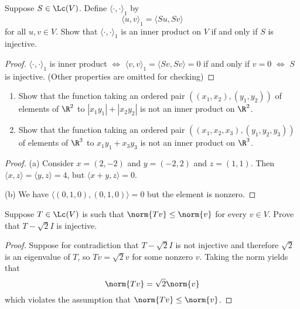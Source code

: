 \documentclass{extarticle}
\begin{document}
\begin{problem}{2}
    Suppose \(S \in \Lc(V)\). Define \(\langle \cdot, \cdot \rangle_1\) by
    \[\langle u,v \rangle_1 = \langle Su,Sv \rangle\]
    for all \(u, v \in V\). Show that \(\langle \cdot,\cdot \rangle_1\) is an inner product on
    \(V\) if and only if \(S\) is injective.
\end{problem}

\begin{proof}
    \(\langle \cdot,\cdot \rangle_1\) is inner product \(\Longleftrightarrow\)
    \(\langle v,v \rangle_1 = \langle Sv,Sv \rangle = 0\) if and only if \(v = 0\) \(\Longleftrightarrow\)
    \(S\) is injective. (Other properties are omitted for checking)
\end{proof}

\begin{problem}{3}
    \begin{enumerate}[label=(\alph*)]
        \item Show that the function taking an ordered pair \(((x_1, x_2), (y_1, y_2))\) of elements of
        \(\R^2\) to \(|x_1 y_1| + |x_2 y_2|\) is not an inner product on \(\R^2\).
        \item Show that the function taking an ordered pair \(((x_1, x_2, x_3), (y_1, y_2, y_3))\) of
        elements of \(\R^3\) to \(x_1y_1 + x_3y_3\) is not an inner product on \(\R^3\).
    \end{enumerate}
\end{problem}

\begin{proof}
(a) Consider \(x = (2, -2)\) and \(y = (-2, 2)\) and \(z = (1, 1)\). Then \(\langle x,z \rangle
= \langle y,z \rangle = 4\), but \(\langle x + y,z \rangle = 0\).

(b) We have \(\langle (0, 1, 0),(0, 1, 0) \rangle = 0\) but the element is nonzero.
\end{proof}

\begin{problem}{4}
    Suppose \(T \in \Lc(V)\) is such that \(\norm{Tv} \leq \norm{v}\) for every \(v \in V\). Prove that
    \(T - \sqrt{2}I\) is injective.
\end{problem}

\begin{proof}
Suppose for contradiction that \( T - \sqrt{2} I \) is not injective and therefore \(\sqrt{2}\) is an eigenvalue
of \(T\), so \(Tv = \sqrt{2}v\) for some nonzero \(v\). Taking the norm yields that
\[\norm{Tv} = \sqrt{2} \norm{v}\]
which violates the assumption that \(\norm{Tv} \leq \norm{v}\).
\end{proof}
\end{document}

